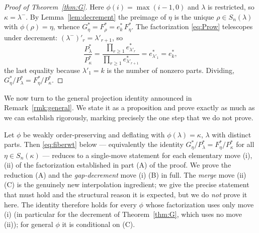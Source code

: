 \begin{proof}[Proof of Theorem~\ref{thm:G}]
Here $\phi(i)=\max(i-1,0)$ and $\lambda$ is restricted, so $\kappa=\lambda^-$. By
Lemma~\ref{lem:decrement} the preimage of $\eta$ is the unique $\rho\in S_n(\lambda)$
with $\phi(\rho)=\eta$, whence $G^*_\eta=F^*_\rho=e^*_k\,F^*_\eta$. The factorization
\eqref{eq:Prow} telescopes under decrement: $(\lambda^-)'_r=\lambda'_{r+1}$, so
\[
\frac{P^*_\lambda}{P^*_\kappa}
=\frac{\prod_{r\ge1}e^*_{\lambda'_r}}{\prod_{r\ge1}e^*_{\lambda'_{r+1}}}
=e^*_{\lambda'_1}=e^*_k ,
\]
the last equality because $\lambda'_1=k$ is the number of nonzero parts. Dividing,
$G^*_\eta/P^*_\lambda=F^*_\eta/P^*_\kappa$.
\end{proof}

\bigskip

We now turn to the general projection identity announced in
Remark~\ref{rmk:general}. We state it as a proposition and prove exactly as much as
we can establish rigorously, marking precisely the one step that we do not prove.

\begin{qthreeproposition}\label{prop:general}
Let $\phi$ be weakly order-preserving and deflating with $\phi(\lambda)=\kappa$,
$\lambda$ with distinct parts. Then \eqref{eq:fiberwt} below --- equivalently the
identity $G^*_\eta/P^*_\lambda=F^*_\eta/P^*_\kappa$ for all $\eta\in S_n(\kappa)$ ---
reduces to a single-move statement for each elementary move \textup{(i)},
\textup{(ii)} of the factorization established in part \textup{(A)} of the proof. We
prove the reduction \textup{(A)} and the \emph{gap-decrement} move \textup{(i)}
\textup{(B)} in full. The \emph{merge} move \textup{(ii)} \textup{(C)} is the
genuinely new interpolation ingredient; we give the precise statement that must hold
and the structural reason it is expected, but we do \emph{not} prove it here. The
identity therefore holds for every $\phi$ whose factorization uses only move
\textup{(i)} (in particular for the decrement of Theorem~\ref{thm:G}, which uses no
move \textup{(ii)}); for general $\phi$ it is conditional on \textup{(C)}.
\end{qthreeproposition}

